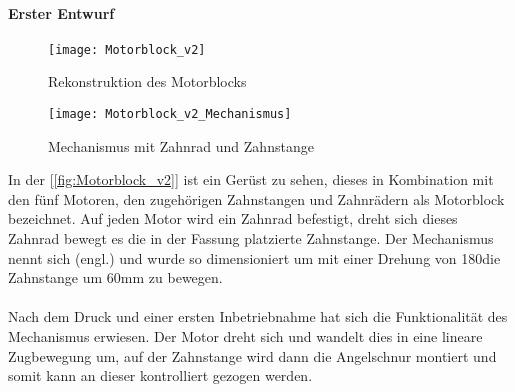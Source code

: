 \documentclass[titlepage,12pt,twoside]{article}
\begin{document}
\paragraph{Erster Entwurf}
\hfill \break
\hfill \break
\begin{figure}[H]
	\begin{center}
		\scalebox{0.8}
		{\texttt{[image: Motorblock\_v2]}}
		\caption{Rekonstruktion des Motorblocks}
		\label{fig:Motorblock_v2}			
	\end{center}
\end{figure}
\begin{figure}[H]
	\begin{center}
		\scalebox{0.8}
		{\texttt{[image: Motorblock\_v2\_Mechanismus]}}
		\caption{Mechanismus mit Zahnrad und Zahnstange}
		\label{fig:Motorblock_v22}			
	\end{center}
\end{figure}
\hfill \break
In der [\textcolor{blue}{\autoref{fig:Motorblock_v2}}] ist ein Gerüst zu sehen, dieses in Kombination mit den fünf Motoren, den zugehörigen Zahnstangen und Zahnrädern als Motorblock bezeichnet. Auf jeden Motor wird ein Zahnrad befestigt, dreht sich dieses Zahnrad bewegt es die 
in der Fassung platzierte Zahnstange. Der Mechanismus nennt sich  (engl.) und wurde so dimensioniert um mit einer Drehung von 180\textdegree die Zahnstange um 60mm zu bewegen. \\
\\
Nach dem Druck und einer ersten Inbetriebnahme hat sich die Funktionalität des Mechanismus erwiesen. Der Motor dreht sich und wandelt dies in eine lineare Zugbewegung um, auf der Zahnstange wird dann die Angelschnur montiert und somit kann an 
dieser kontrolliert gezogen werden. \\
\\
\end{document}
